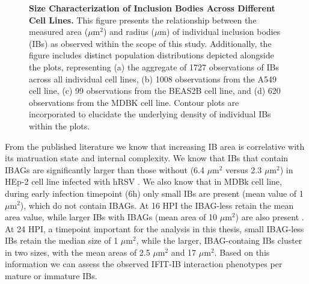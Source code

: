 \begin{figure}
    \caption[Size Characterization of Inclusion Bodies Across Different Cell Lines.]{\textbf{Size Characterization of Inclusion Bodies Across Different Cell Lines.} This figure presents the relationship between the measured area (\(\mu \mbox{m}^2\)) and radius (\(\mu \mbox{m}\)) of individual inclusion bodies (IBs) as observed within the scope of this study. Additionally, the figure includes distinct population distributions depicted alongside the plots, representing (a) the aggregate of 1727 observations of IBs across all individual cell lines, (b) 1008 observations from the A549 cell line, (c) 99 observations from the BEAS2B cell line, and (d) 620 observations from the MDBK cell line. Contour plots are incorporated to elucidate the underlying density of individual IBs within the plots.}
    \label{fig:Size Characterization of Inclusion Bodies Across Different Cell Lines}  
\end{figure}

From the published literature we know that increasing IB area is correlative with its matruation state and internal complexity. We know that IBs that contain IBAGs are significantly larger than those without (6.4 \(\mu \mbox{m}^2\) versus 2.3 \(\mu \mbox{m}^2\)) in HEp-2 cell line infected with hRSV \cite{Rincheval2017FunctionalVirus}. We also know that in MDBk cell line, during early infection timepoint (6h) only small IBs are present (mean value of 1 \(\mu \mbox{m}^2\)), which do not contain IBAGs. At 16 HPI the IBAG-less retain the mean area value, while larger IBs with IBAGs (mean area of 10 \(\mu \mbox{m}^2\)) are also present \cite{Jobe2021BovineResponses}. At 24 HPI, a timepoint important for the analysis in this thesis, small IBAG-less IBs retain the median size of 1 \(\mu \mbox{m}^2\), while the larger, IBAG-containg IBs cluster in two sizes, with the mean areas of 2.5 \(\mu \mbox{m}^2\) and 17 \(\mu \mbox{m}^2\). Based on this information we can assess the observed IFIT-IB interaction phenotypes per mature or immature IBs.


